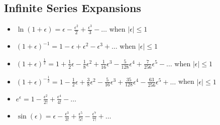 \documentclass[10pt, letterpaper, notitlepage, landscape]{article}
\begin{document}
\subsection{Infinite Series Expansions}
\begin{itemize}
  \item $\ln(1+\epsilon) = \epsilon - \frac{\epsilon^2}{2} + \frac{\epsilon^3}{3} - \dots$ when $|\epsilon| \le 1$
  \item $(1+\epsilon)^{-1} = 1 - \epsilon + \epsilon^2 - \epsilon^3 + \dots$ when $|\epsilon| \le 1$
  \item $(1+\epsilon)^{\frac{1}{2}} = 1 + \frac{1}{2} \epsilon - \frac{1}{8} \epsilon^2 + \frac{1}{16} \epsilon^3 - \frac{5}{128} \epsilon^4 + \frac{7}{256} \epsilon^5 - \dots$ when $|\epsilon| \le 1$
  \item $(1+\epsilon)^{-\frac{1}{2}} = 1 - \frac{1}{2} \epsilon + \frac{3}{8} \epsilon^2 - \frac{5}{16} \epsilon^3 + \frac{35}{128} \epsilon^4 - \frac{63}{256} \epsilon^5 + \dots$ when $|\epsilon| \le 1$
  \item $e^{\epsilon} = 1 - \frac{\epsilon^2}{2!} + \frac{\epsilon^4}{4!} - \dots$
  \item $\sin(\epsilon) = \epsilon - \frac{\epsilon^3}{3!} + \frac{\epsilon^5}{5!} - \frac{\epsilon^7}{7!} + \dots$
\end{itemize}
\end{document}

